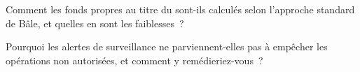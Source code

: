 \begin{interviewq}\label{iq:rc:operational-risk-and-rogue-trading:5}
Comment les fonds propres au titre du  sont-ils calculés selon l'approche standard de Bâle, et quelles en sont les faiblesses~?
\end{interviewq}

\begin{interviewq}\label{iq:rc:operational-risk-and-rogue-trading:6}
Pourquoi les alertes de surveillance ne parviennent-elles pas à empêcher les opérations non autorisées, et comment y remédieriez-vous~?
\end{interviewq}
